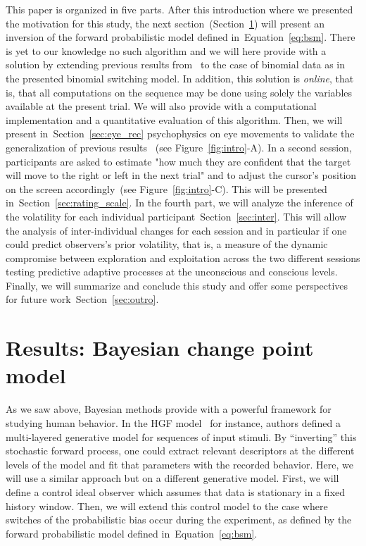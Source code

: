 \documentclass[profile,final,english,draft]{article}%
\newcommand{\citep}[1]{\parencite{#1}}
\newcommand{\citet}[1]{\textcite{#1}}
\newcommand{\seeFig}[1]{Figure~\ref{fig:#1}}
\newcommand{\seeEq}[1]{Equation~\ref{eq:#1}}
\newcommand{\seeSec}[1]{Section~\ref{sec:#1}}
\begin{document}
This paper is organized in five parts.
After this introduction where we presented the motivation for this study,
the next section~(\seeSec{bayesian_change_point}) will present
an inversion of the forward probabilistic model defined in~\seeEq{bsm}.
There is yet to our knowledge no such algorithm and
we will here provide with a solution
by extending previous results from~\citet{AdamsMackay2007}
to the case of binomial data as in the presented binomial switching model.
In addition, this solution is \emph{online},
that is, that all computations on the sequence may be done 
using solely the variables available at the present trial.
We will also provide with a computational implementation
and a quantitative evaluation of this algorithm.
Then, we will present in~\seeSec{eye_rec} psychophysics on eye movements
to validate the generalization of previous results%
~(see \seeFig{intro}-A).
In a second session, participants are asked to estimate
"how much they are confident that
the target will move to the right or left in the next trial" and
to adjust the cursor's position on the screen accordingly~(see \seeFig{intro}-C).
This will be presented in~\seeSec{rating_scale}.
In the fourth part, we will analyze the inference of the volatility
for each individual participant~\seeSec{inter}.
This will allow the analysis of inter-individual changes for each session
and in particular if one could predict observers's prior volatility,
that is, a measure of the dynamic compromise between exploration and exploitation
across the two different sessions testing predictive adaptive processes
at the unconscious and conscious levels.
Finally, we will summarize and conclude this study and
offer some perspectives for future work~\seeSec{outro}.
\section{Results: Bayesian change point model}
\label{sec:bayesian_change_point}
%
%
As we saw above, Bayesian methods provide with
a powerful framework for studying human behavior.
In the HGF model~\citep{Matthys2011} for instance,
authors defined a multi-layered generative model for
sequences of input stimuli.
By ``inverting'' this stochastic forward process,
one could extract relevant descriptors at the different levels of the model
and fit that parameters with the recorded behavior.
Here, we will use a similar approach but on a different generative model.
First, we will define a control ideal observer
which assumes that data is stationary in a fixed history window.
Then, we will extend this control model to the case
where switches of the probabilistic bias occur during the experiment,
as defined by the forward probabilistic model defined in~\seeEq{bsm}.
%
\end{document}
